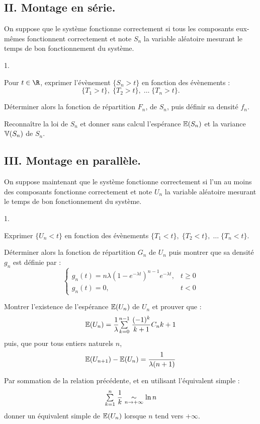 \documentclass[11pt]{article}%
\begin{document}
\subsection*{II. Montage en série.}

On suppose que le système fonctionne correctement si tous les
composants
eux-mêmes fonctionnent correctement et note $S_{n}$ la variable
aléatoire
mesurant le temps de bon fonctionnement du système.

\begin{noliste}{1.}
 \setlength{\itemsep}{4mm}
\item Pour $t\in \R$, exprimer l'évènement $\{S_{n}>t\}$ en fonction
des évènements : 
\[
\{T_{1}>t\},\;\{T_{2}>t\},\;\ldots \;\{T_{n}>t\}.
\]

\item Déterminer alors la fonction de répartition $F_{n}$, de $S_{n}$,
puis définir sa densité $f_{n}$.

\item Reconnaître la loi de $S_{n}$ et donner sans calcul l'espérance $
\mathbb{E}(S_{n})$ et la variance $\mathbb{V}(S_{n})$ de $S_{n}$.
\end{noliste}

\subsection*{III. Montage en parallèle.}

On suppose maintenant que le système fonctionne correctement si l'un au
moins des composants fonctionne correctement et note $U_{n}$ la
variable aléatoire mesurant le temps de bon fonctionnement du système.

\begin{noliste}{1.}
 \setlength{\itemsep}{4mm}
\item Exprimer $\{U_{n}<t\}$ en fonction des évènements $\{T_{1}<t\},\;
\{T_{2}<t\},\;\ldots \;\{T_{n}<t\}$.

\item Déterminer alors la fonction de répartition $G_{n}$ de $U_{n}$
puis
montrer que sa densité $g_{n}$ est définie par : 
\[
\left\{
\begin{array}{cl}
g_{n}(t) = n\lambda \left( 1-e^{-\lambda t}\right) ^{n-1}e^{-\lambda
t}, & 
t\geq 0 \\
g_{n}(t) = 0, & t<0
\end{array}
\right.
\]

\item Montrer l'existence de l'espérance $\mathbb{E}(U_{n})$ de $U_{n}$ et
prouver
que : 
\[
\mathbb{E}(U_{n}) = \dfrac{1}{\lambda }{\textstyle\sum\limits_{k = 0}^{n-1}}\hspace{.1cm}\dfrac{(-1)^{k}}{k +
1}C_{n}{k + 1}
\]
puis, que pour tous entiers naturels $n$, 
\[
\mathbb{E}(U_{n + 1})-\mathbb{E}(U_{n}) = \dfrac{1}{\lambda (n + 1)}
\]

\item Par sommation de la relation précédente, et en utilisant
l'équivalent
simple : 
\[
{\textstyle\sum\limits_{k = 1}^{n}}\hspace{.1cm}\dfrac{1}{k}\underset{n\rightarrow + \infty }{\sim }\ln n
\]
donner un équivalent simple de $\mathbb{E}(U_{n})$ lorsque $n$ tend vers $ +
\infty $.
\end{noliste}
\end{document}
